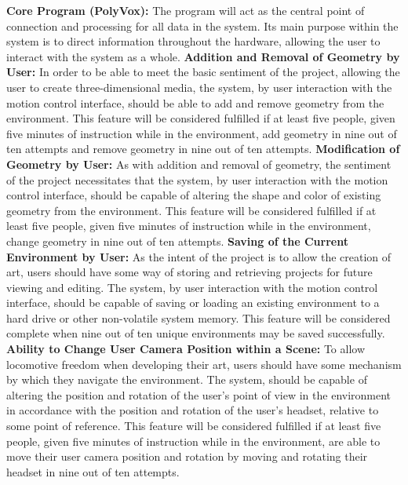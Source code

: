 \documentclass[onecolumn, draftclsnofoot,10pt, compsoc]{IEEEtran}
\newcounter{threesection}[subsubsection]
\begin{document}
\textbf{Core Program (PolyVox):}
\newline
The program will act as the central point of connection and processing for all data in the system.
Its main purpose within the system is to direct information throughout the hardware, allowing the user to interact with the system as a whole.
\textbf{Addition and Removal of Geometry by User:}
\newline
In order to be able to meet the basic sentiment of the project, allowing the user to create three-dimensional media, the system, by user interaction with the motion control interface, should be able to add and remove geometry from the environment.
This feature will be considered fulfilled if at least five people, given five minutes of instruction while in the environment, add geometry in nine out of ten attempts and remove geometry in nine out of ten attempts.
\newline 
\textbf{Modification of Geometry by User:}
\newline
As with addition and removal of geometry, the sentiment of the project necessitates that the system, by user interaction with the motion control interface, should be capable of altering the shape and color of existing geometry from the environment.
This feature will be considered fulfilled if at least five people, given five minutes of instruction while in the environment, change geometry in nine out of ten attempts.
\newline 
\textbf{Saving of the Current Environment by User:}
\newline
As the intent of the project is to allow the creation of art, users should have some way of storing and retrieving projects for future viewing and editing.
The system, by user interaction with the motion control interface, should be capable of saving or loading an existing environment to a hard drive or other non-volatile system memory.
This feature will be considered complete when nine out of ten unique environments may be saved successfully.
\newline 
\textbf{Ability to Change User Camera Position within a Scene:}
\newline
To allow locomotive freedom when developing their art, users should have some mechanism by which they navigate the environment.
The system, should be capable of altering the position and rotation of the user's point of view in the environment in accordance with the position and rotation of the user's headset, relative to some point of reference.
This feature will be considered fulfilled if at least five people, given five minutes of instruction while in the environment, are able to move their user camera position and rotation by moving and rotating their headset in nine out of ten attempts.
\end{document}
